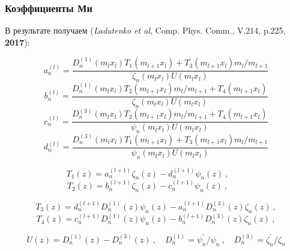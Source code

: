 \documentclass[14pt]{beamer}
\begin{document}
\begin{frame}
  \frametitle{Коэффициенты Ми}
  \footnotesize
  В результате получаем (\textit{Ladutenko et al}, Comp. Phys. Comm., V.214,
  p.225, \textbf{2017}):

\begin{equation*}
\label{eq:6p1}
a^{(l)}_n = \frac
{
    {D^{(1)}_{n}}{\left (m_{l} x_{l} \right )}
    T_1\left (m_{l+1} x_{l} \right )
    +
    T_3\left (m_{l+1} x_{l} \right )
    m_{l}/m_{l+1}
}
{
   \zeta_{n}\left (m_{l} x_{l} \right )
   U\left (m_{l} x_{l} \right )
}
\end{equation*}
\begin{equation*}
\label{eq:6p2}
b^{(l)}_n = \frac
{
    {D^{(1)}_{n}}{\left (m_{l} x_{l} \right )}
    T_2\left (m_{l+1} x_{l} \right )
    m_{l}/m_{l+1}
    +
    T_4\left (m_{l+1} x_{l} \right )
}
{
   \zeta_{n}\left (m_{l} x_{l} \right )
   U\left (m_{l} x_{l} \right )
}
\end{equation*}
\begin{equation*}
\label{eq:6p3}
c^{(l)}_n = \frac
{
    {D^{(3)}_{n}}{\left (m_{l} x_{l} \right )}
    T_2\left (m_{l+1} x_{l} \right )
    m_{l}/m_{l+1}
    +
    T_4\left (m_{l+1} x_{l} \right )
}
{
   \psi_{n}\left (m_{l} x_{l} \right )
   U\left (m_{l} x_{l} \right )
}
\end{equation*}
\begin{equation*}
\label{eq:6p4}
d^{(l)}_n = \frac
{
    {D^{(3)}_{n}}{\left (m_{l} x_{l} \right )}
    T_1\left (m_{l+1} x_{l} \right )
    +
    T_3\left (m_{l+1} x_{l} \right )
    m_{l}/m_{l+1}
}
{
   \psi_{n}\left (m_{l} x_{l} \right )
   U\left (m_{l} x_{l} \right )
}
\end{equation*}
  \scriptsize
  \begin{minipage}{0.4\linewidth}
\begin{equation*}
  T_1(z) =   a^{(l+1)}_{n}  \zeta_{n}(z) 
           - d^{(l+1)}_{n}  \psi_{n}(z)\:,\qquad
\end{equation*}
\begin{equation*}
  T_2(z) =   b^{(l+1)}_{n}  \zeta_{n}(z) 
           - c^{(l+1)}_{n}  \psi_{n}(z)\:,\qquad
\end{equation*}
\end{minipage}
\begin{minipage}{0.49\linewidth}
\begin{equation*}
  T_3(z) =  d^{(l+1)}_{n}  D^{(1)}_{n}(z)  \psi_{n}(z) 
          - a^{(l+1)}_{n}  D^{(3)}_{n}(z)  \zeta_{n} (z)\:,
\end{equation*}
\begin{equation*}
  T_4(z) =  c^{(l+1)}_{n}  D^{(1)}_{n}(z)  \psi_{n}(z) 
          - b^{(l+1)}_{n}  D^{(3)}_{n}(z)  \zeta_{n} (z)\:,
\end{equation*}
\end{minipage}
  \begin{equation*}
  U(z) =    {D^{(1)}_{n}}(z) - {D^{(3)}_{n}}(z)\:,\quad
 D^{(1)}_{n} = \psi^{\prime}_{n}/\psi_{n}\:,\quad
D^{(3)}_{n} = \zeta^{\prime}_{n}/\zeta_{n}
\end{equation*}
\end{frame}
\end{document}
